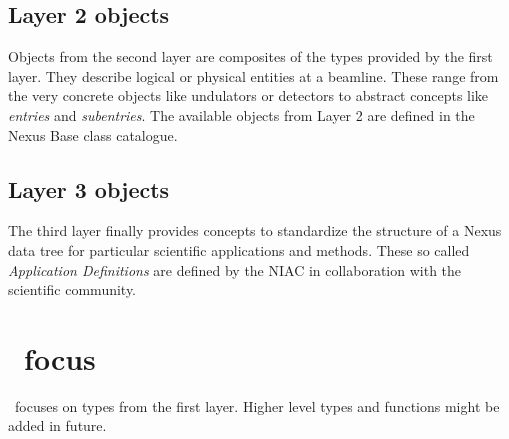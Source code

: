 \subsection{Layer 2 objects}

Objects from the second layer are composites of the types provided by the first
layer. They describe logical or physical entities at a beamline. 
These range from the very concrete objects like undulators or detectors to
abstract concepts like \emph{entries} and \emph{subentries}. 
The available objects from Layer 2 are defined in the Nexus Base class
catalogue.


\subsection{Layer 3 objects}

The third layer finally provides concepts to standardize the structure of a
Nexus data tree for particular scientific applications and methods. 
These so called \emph{Application Definitions} are defined by the NIAC in
collaboration with the scientific community.

\section{\libpniio\ focus}

\libpniio\ focuses on types from the first layer. Higher level types and
functions might be added in future.

